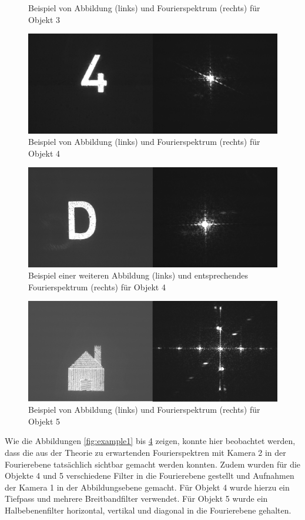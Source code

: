 \begin{figure}
	\centering
	\caption{Beispiel von Abbildung (links) und Fourierspektrum (rechts) für Objekt 3}
	\label{fig:example13}
\end{figure}

\begin{figure}
	\centering
	\includegraphics[width=0.7\linewidth]{images/example4.png}
	\caption{Beispiel von Abbildung (links) und Fourierspektrum (rechts) für Objekt 4}
	\label{fig:example4}
\end{figure}

\begin{figure}
	\centering
	\includegraphics[width=0.7\linewidth]{images/example9.png}
	\caption{Beispiel einer weiteren Abbildung (links) und entsprechendes Fourierspektrum (rechts) für Objekt 4}
	\label{fig:example9}
\end{figure}

\begin{figure}
	\centering
	\includegraphics[width=0.7\linewidth]{images/example16.png}
	\caption{Beispiel von Abbildung (links) und Fourierspektrum (rechts) für Objekt 5}
	\label{fig:example16}
\end{figure}


Wie die Abbildungen \ref{fig:example1} bis \ref{fig:example16} zeigen, konnte hier beobachtet werden, dass die aus der Theorie zu erwartenden Fourierspektren mit Kamera 2 in der Fourierebene tatsächlich sichtbar gemacht werden konnten. 
Zudem wurden für die Objekte 4 und 5 verschiedene Filter in die Fourierebene gestellt und Aufnahmen der Kamera 1 in der Abbildungsebene gemacht. Für Objekt 4 wurde hierzu ein Tiefpass und mehrere Breitbandfilter verwendet. Für Objekt 5 wurde ein Halbebenenfilter horizontal, vertikal und diagonal in die Fourierebene gehalten. \\

